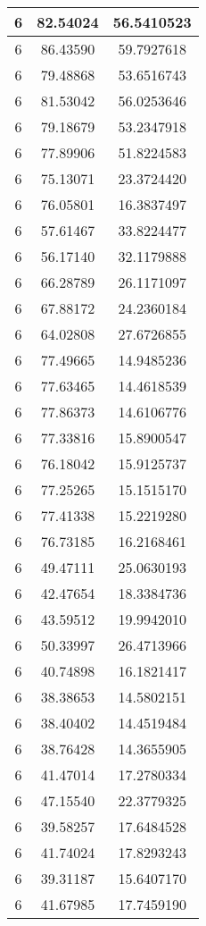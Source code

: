 \documentclass[
]{book}
\begin{document}
\begin{tabular}{c|c|c}
\hline
6 & 82.54024 & 56.5410523\\
\hline
6 & 86.43590 & 59.7927618\\
\hline
6 & 79.48868 & 53.6516743\\
\hline
6 & 81.53042 & 56.0253646\\
\hline
6 & 79.18679 & 53.2347918\\
\hline
6 & 77.89906 & 51.8224583\\
\hline
6 & 75.13071 & 23.3724420\\
\hline
6 & 76.05801 & 16.3837497\\
\hline
6 & 57.61467 & 33.8224477\\
\hline
6 & 56.17140 & 32.1179888\\
\hline
6 & 66.28789 & 26.1171097\\
\hline
6 & 67.88172 & 24.2360184\\
\hline
6 & 64.02808 & 27.6726855\\
\hline
6 & 77.49665 & 14.9485236\\
\hline
6 & 77.63465 & 14.4618539\\
\hline
6 & 77.86373 & 14.6106776\\
\hline
6 & 77.33816 & 15.8900547\\
\hline
6 & 76.18042 & 15.9125737\\
\hline
6 & 77.25265 & 15.1515170\\
\hline
6 & 77.41338 & 15.2219280\\
\hline
6 & 76.73185 & 16.2168461\\
\hline
6 & 49.47111 & 25.0630193\\
\hline
6 & 42.47654 & 18.3384736\\
\hline
6 & 43.59512 & 19.9942010\\
\hline
6 & 50.33997 & 26.4713966\\
\hline
6 & 40.74898 & 16.1821417\\
\hline
6 & 38.38653 & 14.5802151\\
\hline
6 & 38.40402 & 14.4519484\\
\hline
6 & 38.76428 & 14.3655905\\
\hline
6 & 41.47014 & 17.2780334\\
\hline
6 & 47.15540 & 22.3779325\\
\hline
6 & 39.58257 & 17.6484528\\
\hline
6 & 41.74024 & 17.8293243\\
\hline
6 & 39.31187 & 15.6407170\\
\hline
6 & 41.67985 & 17.7459190\\

\end{tabular}
\end{document}
